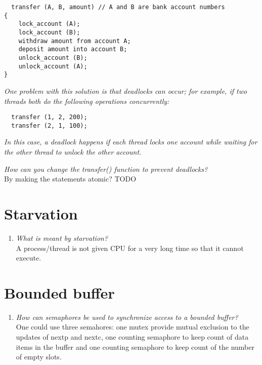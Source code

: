 \documentclass[a4paper]{article}
\begin{document}
\begin{enumerate}
\begin{lstlisting}
  transfer (A, B, amount) // A and B are bank account numbers
{
    lock_account (A);
    lock_account (B);
    withdraw amount from account A;
    deposit amount into account B;
    unlock_account (B);
    unlock_account (A);
}
\end{lstlisting}

\textit{One problem with this solution is that deadlocks can occur; for example, if two threads both do the following operations concurrently:}

\begin{lstlisting}
  transfer (1, 2, 200);
  transfer (2, 1, 100);
\end{lstlisting}

\textit{In this case, a deadlock happens if each thread locks one account while waiting for the other thread to unlock the other account.}

\textit{How can you change the transfer() function to prevent deadlocks?} \\

By making the statements atomic? TODO

\end{enumerate}

\section{Starvation}
\begin{enumerate}
  \item \textit{What is meant by starvation?} \\

    A process/thread is not given CPU for a very long time so that it cannot execute.
\end{enumerate}

\section{Bounded buffer}
\begin{enumerate}
  \item \textit{How can semaphores be used to synchronize access to a bounded buffer?} \\

    One could use three semahores: one mutex provide mutual exclusion to the updates of nextp and nextc, one counting semaphore to keep count of data items in the buffer and one counting semaphore to keep count of the number of empty slots.
\end{enumerate}
\end{document}
